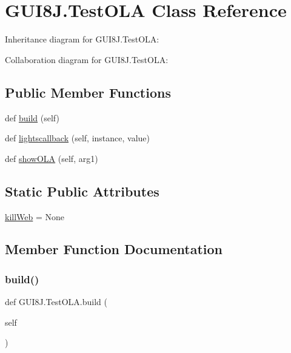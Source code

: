 \hypertarget{classGUI8J_1_1TestOLA}{}\section{G\+U\+I8\+J.\+Test\+O\+LA Class Reference}
\label{classGUI8J_1_1TestOLA}


Inheritance diagram for G\+U\+I8\+J.\+Test\+O\+LA\+:


Collaboration diagram for G\+U\+I8\+J.\+Test\+O\+LA\+:
\subsection*{Public Member Functions}
\begin{DoxyCompactItemize}
\item 
def \hyperlink{classGUI8J_1_1TestOLA_a47fb9ef9e20bc4a64626590331057d60}{build} (self)
\item 
def \hyperlink{classGUI8J_1_1TestOLA_a12ec5bfda2ba9d420761f94685749f71}{lightscallback} (self, instance, value)
\item 
def \hyperlink{classGUI8J_1_1TestOLA_aee815c8adc3e28174c670bc78d2c3efe}{show\+O\+LA} (self, arg1)
\end{DoxyCompactItemize}
\subsection*{Static Public Attributes}
\begin{DoxyCompactItemize}
\item 
\hyperlink{classGUI8J_1_1TestOLA_ab8bbf2f1542fc9201f45d02b43e40ee3}{kill\+Web} = None
\end{DoxyCompactItemize}


\subsection{Member Function Documentation}
\mbox{\label{classGUI8J_1_1TestOLA_a47fb9ef9e20bc4a64626590331057d60}} 
\subsubsection{\texorpdfstring{build()}{build()}}
{\footnotesize\ttfamily def G\+U\+I8\+J.\+Test\+O\+L\+A.\+build (\begin{DoxyParamCaption}\item[{}]{self }\end{DoxyParamCaption})}

